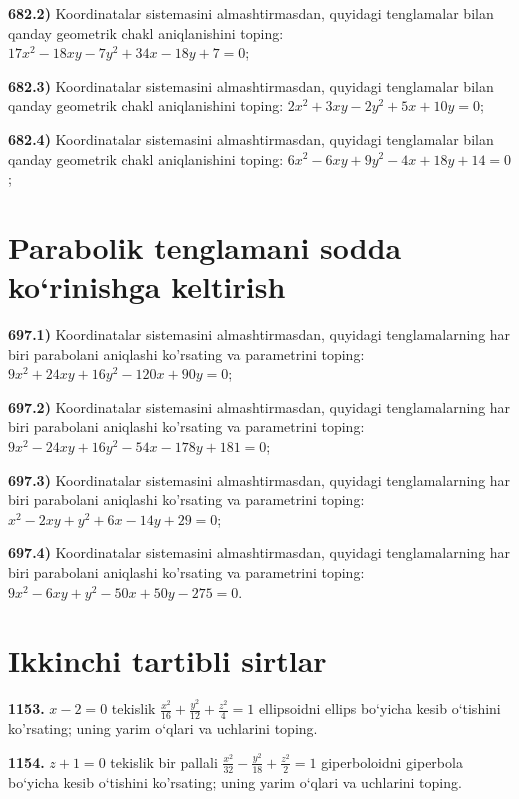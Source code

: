 \textbf{682.2)} Koordinatalar sistemasini almashtirmasdan, quyidagi tenglamalar bilan qanday geometrik chakl aniqlanishini toping: $17 x^2-18 x y-7 y^2+34 x-18 y+7=0$;

\textbf{682.3)} Koordinatalar sistemasini almashtirmasdan, quyidagi tenglamalar bilan qanday geometrik chakl aniqlanishini toping: $2 x^2+3 x y-2 y^2+5 x+10 y=0$;

\textbf{682.4)} Koordinatalar sistemasini almashtirmasdan, quyidagi tenglamalar bilan qanday geometrik chakl aniqlanishini toping: $6 x^2-6 x y+9 y^2-4 x+18 y+14=0$;



\section{Parabolik tenglamani sodda ko‘rinishga keltirish}



\textbf{697.1)} Koordinatalar sistemasini almashtirmasdan, quyidagi tenglamalarning har biri parabolani aniqlashi ko'rsating va parametrini toping: $9 x^2+24 x y+16 y^2-120 x+90 y=0$;

\textbf{697.2)} Koordinatalar sistemasini almashtirmasdan, quyidagi tenglamalarning har biri parabolani aniqlashi ko'rsating va parametrini toping: $9 x^2-24 x y+16 y^2-54 x-178 y+181=0$;

\textbf{697.3)} Koordinatalar sistemasini almashtirmasdan, quyidagi tenglamalarning har biri parabolani aniqlashi ko'rsating va parametrini toping: $x^2-2 x y+y^2+6 x-14 y+29=0$;

\textbf{697.4)} Koordinatalar sistemasini almashtirmasdan, quyidagi tenglamalarning har biri parabolani aniqlashi ko'rsating va parametrini toping: $9 x^2-6 x y+y^2-50 x+50 y-275=0$.



\section{Ikkinchi tartibli sirtlar}



\textbf{1153.} $x-2=0$ tekislik $\frac{x^2}{16}+\frac{y^2}{12}+\frac{z^2}{4}=1$ ellipsoidni ellips bo‘yicha kesib o‘tishini ko'rsating; uning yarim o‘qlari va uchlarini toping.

\textbf{1154.} $z+1=0$ tekislik bir pallali $\frac{x^2}{32}-\frac{y^2}{18}+\frac{z^2}{2}=1$ giperboloidni giperbola bo‘yicha kesib o‘tishini ko'rsating; uning yarim o‘qlari va uchlarini toping.

